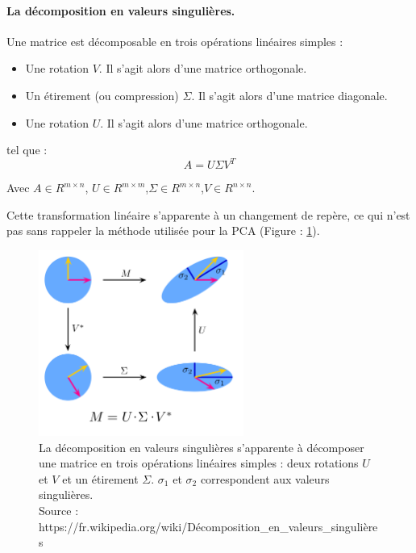 \paragraph{La décomposition en valeurs singulières.} Une matrice est décomposable en trois opérations linéaires simples \cite{ICA}:
\smallbreak
\begin{itemize}
	\item Une rotation $V$. Il s'agit alors d'une matrice orthogonale. 
	\smallbreak
	\item Un étirement (ou compression) $\Sigma$. Il s'agit alors d'une matrice diagonale. 
	\smallbreak
	\item Une rotation $U$. Il s'agit alors d'une matrice orthogonale. 
\end{itemize}

tel que : 
\begin{equation}
	A = U\Sigma V^T
\end{equation}

Avec $A \in R^{m\times n}$, $U \in R^{m\times m}$,$\Sigma \in R^{m\times n}$,$ V \in R^{n\times n}$.

Cette transformation linéaire s'apparente à un changement de repère, ce qui n'est pas sans rappeler la méthode utilisée pour la PCA (Figure : \ref{svd}). 

\begin{figure}[h]
	\centering\includegraphics[width=0.6\textwidth]{images/SVD.png}
	\caption[Décomposition en valeurs singulières]{La décomposition en valeurs singulières s'apparente à décomposer une matrice en trois opérations linéaires simples : deux rotations $U$ et $V$ et un étirement $\Sigma$. $\sigma_1$ et $\sigma_2$ correspondent aux valeurs singulières. \\Source : https://fr.wikipedia.org/wiki/Décomposition\_en\_valeurs\_singulières}
	\label{svd}
\end{figure}

